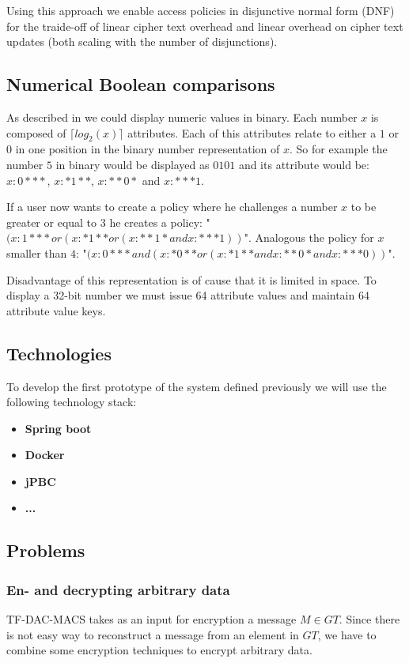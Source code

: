 Using this approach we enable access policies in disjunctive normal form (DNF) for the traide-off of linear cipher text overhead and linear overhead on cipher text updates (both scaling with the number of disjunctions).

\subsection{Numerical Boolean comparisons}
As described in \cite{bethencourt2007ciphertext} we could display numeric values in binary. Each number $x$ is composed of $\lceil log_2(x) \rceil$ attributes. Each of this attributes relate to either a $1$ or $0$ in one position in the binary number representation of $x$. So for example the number $5$ in binary would be displayed as $0101$ and its attribute would be: $x:0***$, $x:*1**$, $x:**0*$ and $x:***1$. 

If a user now wants to create a policy where he challenges a number $x$ to be greater or equal to $3$ he creates a policy: "$(x:1*** or (x:*1** or (x:**1* and x:***1))$". Analogous the policy for $x$ smaller than $4$: "$(x:0*** and (x:*0** or (x:*1** and x:**0* and x:***0))$".

Disadvantage of this representation is of cause that it is limited in space. To display a 32-bit number we must issue 64 attribute values and maintain 64 attribute value keys. 


\subsection{Technologies}
To develop the first prototype of the system defined previously we will use the following technology stack:

\begin{itemize}
  \item \textbf{Spring boot}
  \item \textbf{Docker}
  \item \textbf{jPBC} \cite{ISCC:DecIov11}
  \item \textbf{...}
\end{itemize}

\subsection{Problems}

\subsubsection{En- and decrypting arbitrary data}
TF-DAC-MACS takes as an input for encryption a message $M \in GT$. Since there is not easy way to reconstruct a message from an element in $GT$, we have to combine some encryption techniques to encrypt arbitrary data. 

